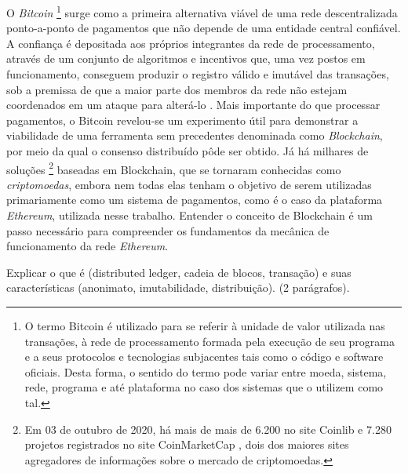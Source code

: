 \documentclass[a4paper,11pt]{article}
\begin{document}
O \emph{Bitcoin}
\footnote{O termo Bitcoin é utilizado para se referir à unidade de valor utilizada nas transações, à rede de processamento formada pela execução de seu programa e a seus protocolos e tecnologias subjacentes tais como o código e software oficiais.
Desta forma, o sentido do termo pode variar entre moeda, sistema, rede, programa e até plataforma no caso dos sistemas que o utilizem como tal.}
surge como a primeira alternativa viável de uma rede descentralizada ponto-a-ponto de pagamentos que não depende de uma entidade central confiável.
A confiança é depositada aos próprios integrantes da rede de processamento, através de um conjunto de algoritmos e incentivos que, uma vez postos em funcionamento, conseguem produzir o registro válido e imutável das transações, sob a premissa de que a maior parte dos membros da rede não estejam coordenados em um ataque para alterá-lo \cite{nakamoto2008bitcoin}.
Mais importante do que processar pagamentos, o Bitcoin revelou-se um experimento útil para demonstrar a viabilidade de uma ferramenta sem precedentes denominada como \emph{Blockchain}, por meio da qual o consenso distribuído pôde ser obtido.
Já há milhares de soluções
\footnote{Em 03 de outubro de 2020, há mais de mais de 6.200 no site Coinlib e 7.280 projetos registrados no site CoinMarketCap \cite{CoinMarketCap2020, Coinlib2020}, dois dos maiores sites agregadores de informações sobre o mercado de criptomoedas.}
baseadas em Blockchain, que se tornaram conhecidas como \emph{criptomoedas}, embora nem todas elas tenham o objetivo de serem utilizadas primariamente como um sistema de pagamentos, como é o caso da plataforma \emph{Ethereum}, utilizada nesse trabalho.
Entender o conceito de Blockchain é um passo necessário para compreender os fundamentos da mecânica de funcionamento da rede \emph{Ethereum}.

{\color{ForestGreen}Explicar o que é (distributed ledger, cadeia de blocos, transação) e suas características (anonimato, imutabilidade, distribuição). (2 parágrafos).}
\end{document}

